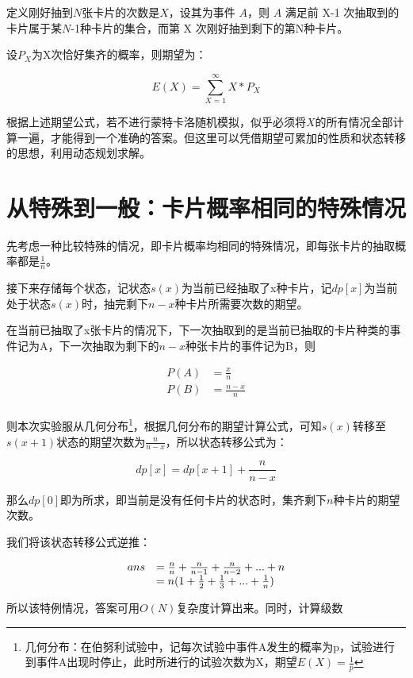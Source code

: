 \documentclass[master]{thesis-uestc}
\begin{document}
定义刚好抽到$N$张卡片的次数是$X$，设其为事件 $A$，则 $A$ 满足前 X-1 次抽取到的卡片属于某$N$-1种卡片的集合，而第 X 次刚好抽到剩下的第N种卡片。

设$P_X$为X次恰好集齐的概率，则期望为：

$$
E(X)=\sum\limits_{X=1}^{\infty}X*P_X 
$$

根据上述期望公式，若不进行蒙特卡洛随机模拟，似乎必须将$X
$的所有情况全部计算一遍，才能得到一个准确的答案。但这里可以凭借期望可累加的性质和状态转移的思想，利用动态规划求解。

\section{从特殊到一般：卡片概率相同的特殊情况}

先考虑一种比较特殊的情况，即卡片概率均相同的特殊情况，即每张卡片的抽取概率都是$\frac{1}{n}$。

接下来存储每个状态，记状态$s(x)$为当前已经抽取了x种卡片，记$dp[x]$为当前处于状态$s(x)$时，抽完剩下$n-x$种卡片所需要次数的期望。

在当前已抽取了x张卡片的情况下，下一次抽取到的是当前已抽取的卡片种类的事件记为A，下一次抽取为剩下的$n-x$种张卡片的事件记为B，则

$$
\begin{array}{lll}

P(A) & = \frac{x}{n} \\
P(B) & = \frac{n-x}{n} \\

\end{array}
$$

则本次实验服从几何分布\footnote{几何分布：在伯努利试验中，记每次试验中事件A发生的概率为p，试验进行到事件A出现时停止，此时所进行的试验次数为X，期望$E(X)=\frac{1}{p}$}，根据几何分布的期望计算公式，可知$s(x)$转移至$s(x+1)$状态的期望次数为$\frac{n}{n-x}$，所以状态转移公式为：

$$
dp[x]=dp[x+1]+\frac{n}{n-x}
$$

那么$dp[0]$即为所求，即当前是没有任何卡片的状态时，集齐剩下$n$种卡片的期望次数。

我们将该状态转移公式逆推：

$$
\begin{array}{lll}
ans&=\frac{n}{n}+\frac{n}{n-1}+\frac{n}{n-2}+...+n\\
&=n\*(1+\frac{1}{2}+\frac{1}{3}+...+\frac{1}{n})
\end{array}
$$

所以该特例情况，答案可用$O(N)$复杂度计算出来。同时，计算级数
\end{document}

